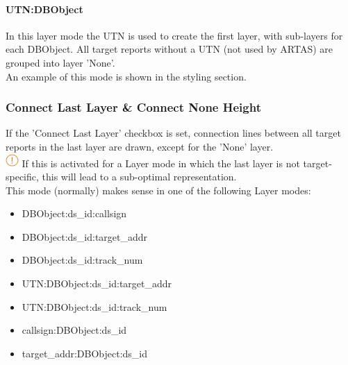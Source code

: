 \paragraph{UTN:DBObject}

In this layer mode the UTN is used to create the first layer, with sub-layers for each DBObject. All target reports without a UTN (not used by ARTAS) are grouped into layer 'None'.  \\

An example of this mode is shown in the styling section.


\subsubsection{Connect Last Layer \& Connect None Height}

If the 'Connect Last Layer' checkbox is set, connection lines between all target reports in the last layer are drawn, except for the 'None' layer. \\

\includegraphics[width=0.5cm]{../../data/icons/hint.png} If this is activated for a Layer mode in which the last layer is not target-specific, this will lead to a sub-optimal representation. \\

This mode (normally) makes sense in one of the following Layer modes:

\begin{itemize}
 \item DBObject:ds\_id:callsign
 \item DBObject:ds\_id:target\_addr
 \item DBObject:ds\_id:track\_num
 \item UTN:DBObject:ds\_id:target\_addr
 \item UTN:DBObject:ds\_id:track\_num
 \item callsign:DBObject:ds\_id 
 \item target\_addr:DBObject:ds\_id
\end{itemize}
\  \\


